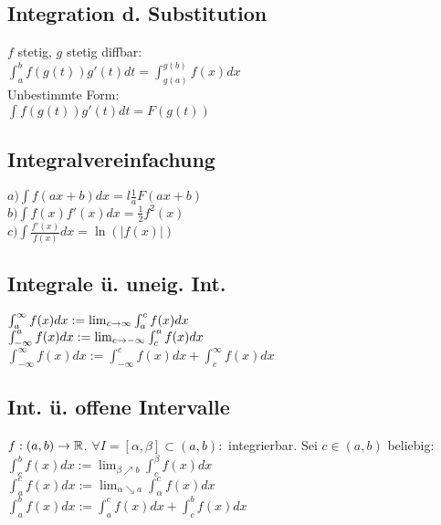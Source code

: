 \subsection*{Integration d. Substitution}
$f$ stetig, $g$ stetig diffbar:\\
$\int_a ^b f(g(t)) g'(t) dt = \int_{g(a)}^{g(b)} f(x) dx$\\
Unbestimmte Form:\\
$\int f(g(t)) g'(t) dt = F(g(t))$
\subsection*{Integralvereinfachung}
    $a) \int f(ax + b) dx = l\frac{1}{a} F(ax + b)$\\
    $b) \int f(x) f'(x) dx = \frac{1}{2} f^2(x)$\\
    $c) \int \frac{f'(x)}{f(x)} dx = \ln (|f(x)|)$
\subsection*{Integrale ü. uneig. Int.}
$\int_a^\infty f(x) dx := \lim_{c \rightarrow \infty} \int_a^c f(x) dx$\\
$\int_{- \infty}^a f(x) dx := \lim_{c \rightarrow - \infty} \int_c^a f(x) dx$\\
$\int_{-\infty}^\infty f(x) dx := \int_{-\infty}^c f(x) dx + \int_c^\infty f(x) dx$
\subsection*{Int. ü. offene Intervalle}
$f:(a, b) \rightarrow \mathbb R$. $\forall I = [\alpha, \beta]\subset(a, b):$ integrierbar. Sei $c \in (a, b)$ beliebig:\\
    $\int_c^b f(x) dx := \lim_{\beta \nearrow b} \int_c^\beta f(x) dx$\\
    $\int_a^c f(x) dx := \lim_{\alpha \searrow a} \int_\alpha^c f(x) dx$\\
    $\int_a^b f(x) dx := \int_a^c f(x) dx + \int_c^b f(x) dx$\\
